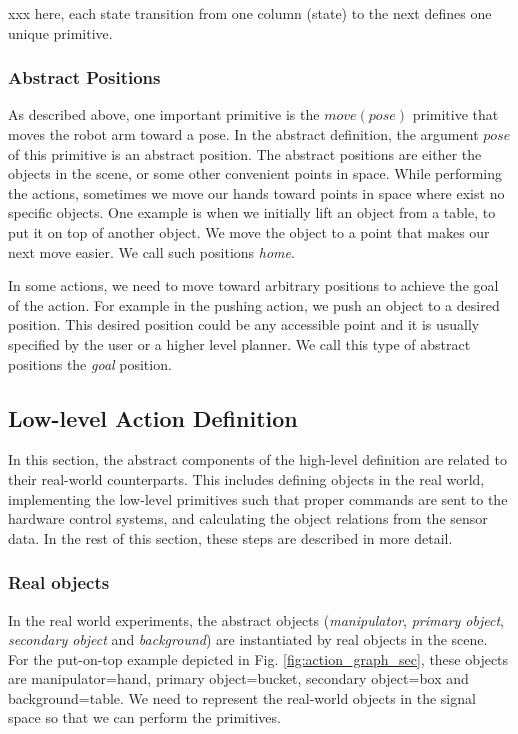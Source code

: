 xxx here, each state transition from one column (state) to the next defines one unique primitive.


\subsubsection{Abstract Positions}

As described above, one important primitive is the $move(pose)$ primitive that moves the robot arm toward a pose.
In the abstract definition, the argument $pose$ of this primitive is an abstract position.
The abstract positions are either the objects in the scene, or some other convenient points in space.
While performing the actions, sometimes we move our hands toward points in space where exist no specific objects.
One example is when we initially lift an object from a table, to put it on top of another object.
We move the object to a point that makes our next move easier.
We call such positions \textit{home}.

In some actions, we need to move toward arbitrary positions to achieve the goal of the action.
For example in the pushing action, we push an object to a desired position.
This desired position could be any accessible point and it is usually specified by the user or a higher level planner.
We call this type of abstract positions the \textit{goal} position.



\subsection{Low-level Action Definition}
\label{sec:low-level}
In this section, the abstract components of the high-level definition are related to their real-world counterparts.
This includes defining objects in the real world, implementing the low-level primitives such that proper commands are sent to the hardware control systems,
and calculating the object relations from the sensor data.
In the rest of this section, these steps are described in more detail.


\subsubsection{Real objects}
In the real world experiments, the abstract objects (\textit{manipulator}, \textit{primary object}, \textit{secondary object} and \textit{background})
are instantiated by real objects in the scene.
For the put-on-top example depicted in Fig. \ref{fig:action_graph_sec},
these objects are manipulator=hand, primary object=bucket, secondary object=box and background=table.
We need to represent the real-world objects in the signal space so that we can perform the primitives.

